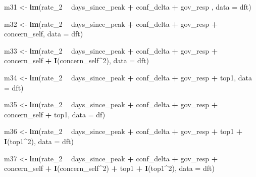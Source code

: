 \documentclass[
]{article}
\newenvironment{Shaded}{\begin{snugshade}}{\end{snugshade}}
\newcommand{\DataTypeTok}[1]{\textcolor[rgb]{0.13,0.29,0.53}{#1}}
\newcommand{\DecValTok}[1]{\textcolor[rgb]{0.00,0.00,0.81}{#1}}
\newcommand{\KeywordTok}[1]{\textcolor[rgb]{0.13,0.29,0.53}{\textbf{#1}}}
\newcommand{\NormalTok}[1]{#1}
\newcommand{\OperatorTok}[1]{\textcolor[rgb]{0.81,0.36,0.00}{\textbf{#1}}}
\newcommand{\StringTok}[1]{\textcolor[rgb]{0.31,0.60,0.02}{#1}}
\begin{document}
\begin{Shaded}
\begin{Highlighting}[]
\NormalTok{m31 <-}\StringTok{ }\KeywordTok{lm}\NormalTok{(rate_}\DecValTok{2} \OperatorTok{~}\StringTok{ }\NormalTok{days_since_peak }\OperatorTok{+}\StringTok{ }\NormalTok{conf_delta }\OperatorTok{+}\StringTok{ }\NormalTok{gov_resp , }\DataTypeTok{data =}\NormalTok{ dft)}

\NormalTok{m32 <-}\StringTok{ }\KeywordTok{lm}\NormalTok{(rate_}\DecValTok{2} \OperatorTok{~}\StringTok{ }\NormalTok{days_since_peak }\OperatorTok{+}\StringTok{ }\NormalTok{conf_delta }\OperatorTok{+}\StringTok{ }\NormalTok{gov_resp }\OperatorTok{+}\StringTok{ }\NormalTok{concern_self, }\DataTypeTok{data =}\NormalTok{ dft)}

\NormalTok{m33 <-}\StringTok{ }\KeywordTok{lm}\NormalTok{(rate_}\DecValTok{2} \OperatorTok{~}\StringTok{ }\NormalTok{days_since_peak }\OperatorTok{+}\StringTok{ }\NormalTok{conf_delta }\OperatorTok{+}\StringTok{ }\NormalTok{gov_resp }\OperatorTok{+}\StringTok{ }\NormalTok{concern_self }\OperatorTok{+}\StringTok{ }\KeywordTok{I}\NormalTok{(concern_self}\OperatorTok{^}\DecValTok{2}\NormalTok{), }\DataTypeTok{data =}\NormalTok{ dft)}

\NormalTok{m34 <-}\StringTok{ }\KeywordTok{lm}\NormalTok{(rate_}\DecValTok{2} \OperatorTok{~}\StringTok{ }\NormalTok{days_since_peak }\OperatorTok{+}\StringTok{ }\NormalTok{conf_delta }\OperatorTok{+}\StringTok{ }\NormalTok{gov_resp }\OperatorTok{+}\StringTok{  }\NormalTok{top1, }\DataTypeTok{data =}\NormalTok{ dft)}

\NormalTok{m35 <-}\StringTok{ }\KeywordTok{lm}\NormalTok{(rate_}\DecValTok{2} \OperatorTok{~}\StringTok{ }\NormalTok{days_since_peak }\OperatorTok{+}\StringTok{ }\NormalTok{conf_delta }\OperatorTok{+}\StringTok{ }\NormalTok{gov_resp }\OperatorTok{+}\StringTok{ }\NormalTok{concern_self }\OperatorTok{+}\StringTok{ }\NormalTok{top1, }\DataTypeTok{data =}\NormalTok{ df)}

\NormalTok{m36 <-}\StringTok{ }\KeywordTok{lm}\NormalTok{(rate_}\DecValTok{2} \OperatorTok{~}\StringTok{ }\NormalTok{days_since_peak }\OperatorTok{+}\StringTok{ }\NormalTok{conf_delta }\OperatorTok{+}\StringTok{ }\NormalTok{gov_resp }\OperatorTok{+}\StringTok{ }\NormalTok{top1 }\OperatorTok{+}\StringTok{ }\KeywordTok{I}\NormalTok{(top1}\OperatorTok{^}\DecValTok{2}\NormalTok{), }\DataTypeTok{data =}\NormalTok{ dft)}

\NormalTok{m37 <-}\StringTok{ }\KeywordTok{lm}\NormalTok{(rate_}\DecValTok{2} \OperatorTok{~}\StringTok{ }\NormalTok{days_since_peak }\OperatorTok{+}\StringTok{ }\NormalTok{conf_delta }\OperatorTok{+}\StringTok{ }\NormalTok{gov_resp }\OperatorTok{+}\StringTok{  }\NormalTok{concern_self }\OperatorTok{+}\StringTok{ }\KeywordTok{I}\NormalTok{(concern_self}\OperatorTok{^}\DecValTok{2}\NormalTok{) }\OperatorTok{+}\StringTok{ }\NormalTok{top1 }\OperatorTok{+}\StringTok{ }\KeywordTok{I}\NormalTok{(top1}\OperatorTok{^}\DecValTok{2}\NormalTok{), }\DataTypeTok{data =}\NormalTok{ dft)}


\end{Highlighting}
\end{Shaded}
\end{document}
